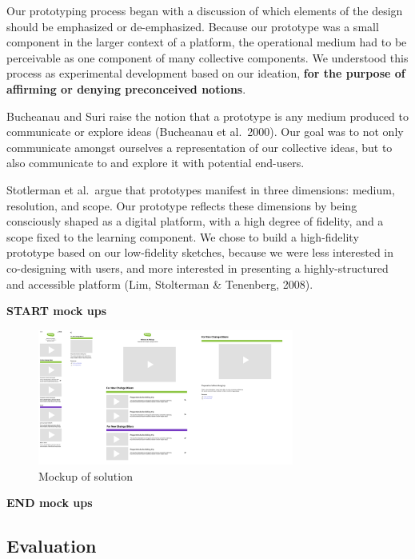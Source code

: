 Our prototyping process began with a discussion of which elements of the
design should be emphasized or de-emphasized. Because our prototype was
a small component in the larger context of a platform, the operational
medium had to be perceivable as one component of many collective
components. We understood this process as experimental development based
on our ideation, \textbf{for the purpose of affirming or denying
preconceived notions}.

Bucheanau and Suri raise the notion that a prototype is any medium
produced to communicate or explore ideas (Bucheanau et al.~2000). Our
goal was to not only communicate amongst ourselves a representation of
our collective ideas, but to also communicate to and explore it with
potential end-users.

Stotlerman et al.~argue that prototypes manifest in three dimensions:
medium, resolution, and scope. Our prototype reflects these dimensions
by being consciously shaped as a digital platform, with a high degree of
fidelity, and a scope fixed to the learning component. We chose to build
a high-fidelity prototype based on our low-fidelity sketches, because we
were less interested in co-designing with users, and more interested in
presenting a highly-structured and accessible platform (Lim, Stolterman
\& Tenenberg, 2008).

\textbf{START mock ups}

\begin{figure}
\hypertarget{fig:mockup}{%
\centering
\includegraphics[width=0.75\textwidth,height=\textheight]{./figures/mockup.pdf}
\caption{Mockup of solution}\label{fig:mockup}
}
\end{figure}

\textbf{END mock ups}

\hypertarget{sec:evaluation}{%
\subsection{Evaluation}\label{sec:evaluation}}

